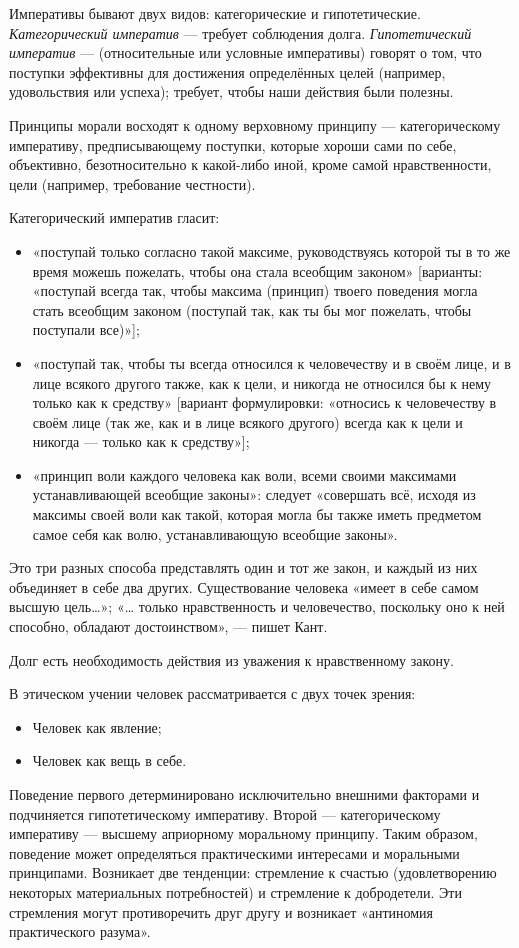 \documentclass[12pt]{article}
\begin{document}
Императивы бывают двух видов: категорические и гипотетические.
\textit{Категорический императив} --- требует соблюдения долга.
\textit{Гипотетический императив} --- (относительные или условные императивы) говорят о том, что поступки эффективны для достижения определённых целей (например, удовольствия или успеха); требует, чтобы наши действия были полезны.

Принципы морали восходят к одному верховному принципу — категорическому императиву, предписывающему поступки, которые хороши сами по себе, объективно, безотносительно к какой-либо иной, кроме самой нравственности, цели (например, требование честности).

Категорический императив гласит:
\begin{itemize}
\item «поступай только согласно такой максиме, руководствуясь которой ты в то же время можешь пожелать,
	чтобы она стала всеобщим законом»
	[варианты: «поступай всегда так, чтобы максима (принцип) твоего поведения могла стать всеобщим законом
	(поступай так, как ты бы мог пожелать, чтобы поступали все)»];
\item «поступай так, чтобы ты всегда относился к человечеству и в своём лице, и в лице всякого другого также,
	как к цели, и никогда не относился бы к нему только как к средству»
	[вариант формулировки: «относись к человечеству в своём лице (так же, как и в лице всякого другого)
	всегда как к цели и никогда — только как к средству»];
\item «принцип воли каждого человека как воли, всеми своими максимами устанавливающей всеобщие законы»:
	следует «совершать всё, исходя из максимы своей воли как такой,
	которая могла бы также иметь предметом самое себя как волю, устанавливающую всеобщие законы».
\end{itemize}
Это три разных способа представлять один и тот же закон, и каждый из них объединяет в себе два других.
Существование человека «имеет в себе самом высшую цель…»; «… только нравственность и человечество, поскольку оно к ней способно, обладают достоинством», — пишет Кант.

Долг есть необходимость действия из уважения к нравственному закону.

В этическом учении человек рассматривается с двух точек зрения:
\begin{itemize}
\item Человек как явление;
\item Человек как вещь в себе.
\end{itemize}
Поведение  первого детерминировано исключительно  внешними факторами  и  подчиняется  гипотетическому
императиву. Второй — категорическому императиву — высшему априорному моральному принципу. Таким
образом, поведение может определяться практическими интересами и моральными принципами. Возникает две
тенденции: стремление к счастью (удовлетворению некоторых материальных потребностей) и стремление к
добродетели. Эти стремления могут противоречить друг другу и возникает «антиномия практического разума».
\end{document}
